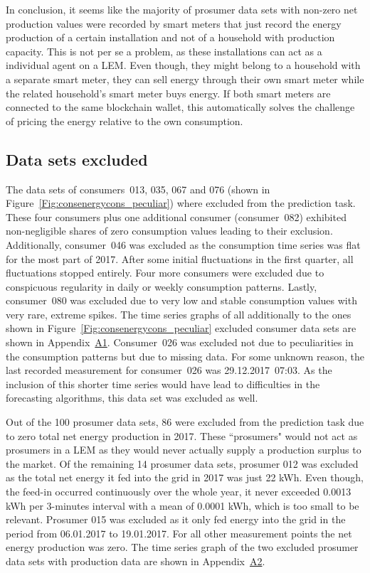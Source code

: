In conclusion, it seems like the majority of prosumer data sets with non-zero net production values were recorded by smart meters that just record the energy production of a certain installation and not of a household with production capacity. This is not per se a problem, as these installations can act as a individual agent on a LEM. Even though, they might belong to a household with a separate smart meter, they can sell energy through their own smart meter while the related household's smart meter buys energy. If both smart meters are connected to the same blockchain wallet, this automatically solves the challenge of pricing the energy relative to the own consumption.




\subsection{Data sets excluded}\label{Sec:Data;Subsec:Exclusion}
The data sets of consumers~013, 035, 067 and 076 (shown in Figure~\ref{Fig:consenergycons_peculiar}) where excluded from the prediction task. These four consumers plus one additional consumer (consumer~082) exhibited non-negligible shares of zero consumption values leading to their exclusion. Additionally, consumer~046 was excluded as the consumption time series was flat for the most part of 2017. After some initial fluctuations in the first quarter, all fluctuations stopped entirely. Four more consumers were excluded due to conspicuous regularity in daily or weekly consumption patterns. Lastly, consumer~080 was excluded due to very low and stable consumption values with very rare, extreme spikes. The time series graphs of all additionally to the ones shown in Figure~\ref{Fig:consenergycons_peculiar} excluded consumer data sets are shown in Appendix~\hyperlink{AppA1:Figures:Excludedc}{A1}. Consumer~026 was excluded not due to peculiarities in the consumption patterns but due to missing data. For some unknown reason, the last recorded measurement for consumer~026 was 29.12.2017~07:03. As the inclusion of this shorter time series would have lead to difficulties in the forecasting algorithms, this data set was excluded as well.

Out of the 100 prosumer data sets, 86 were excluded from the prediction task due to zero total net energy production in 2017. These ``prosumers" would not act as prosumers in a LEM as they would never actually supply a production surplus to the market. Of the remaining 14 prosumer data sets, prosumer 012 was excluded as the total net energy it fed into the grid in 2017 was just 22 kWh. Even though, the feed-in occurred continuously over the whole year, it never exceeded 0.0013 kWh per 3-minutes interval with a mean of 0.0001 kWh, which is too small to be relevant. Prosumer 015 was excluded as it only fed energy into the grid in the period from 06.01.2017 to 19.01.2017. For all other measurement points the net energy production was zero. The time series graph of the two excluded prosumer data sets with production data are shown in Appendix~\hyperlink{AppA2:Figures:Excludedp}{A2}.

